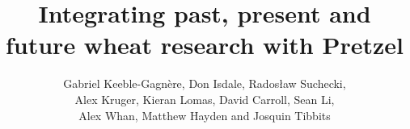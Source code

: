 \documentclass[10pt,a4paper]{article}
\title{Integrating past, present and future wheat research with Pretzel}
\author{Gabriel Keeble-Gagn\`ere,
Don Isdale,
Rados{\l}aw Suchecki,\\
Alex Kruger,
Kieran Lomas,
David Carroll,
Sean Li,\\
Alex Whan,
Matthew Hayden
and Josquin Tibbits}
\begin{document}
\maketitle

\begin{abstract}
\noindent

\end{abstract}


\end{document}
